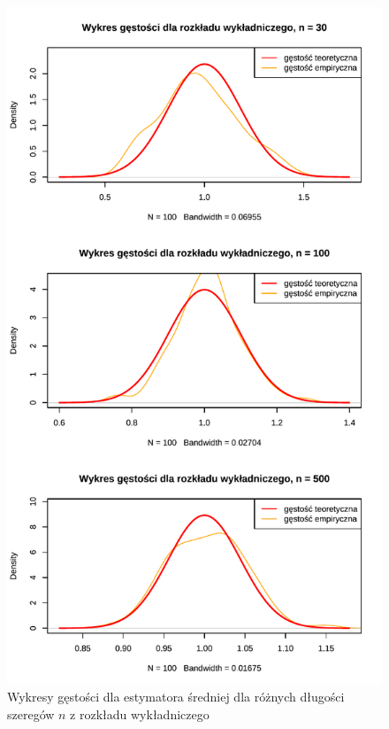\documentclass[10pt, a4paper]{article}\usepackage[]{graphicx}\usepackage[]{xcolor}
\makeatletter
\def\maxwidth{ %
  \ifdim\Gin@nat@width>\linewidth
    \linewidth
  \else
    \Gin@nat@width
  \fi
}
\newenvironment{knitrout}{}{} %
\makeatother
\begin{document}
\begin{knitrout}
\color{fgcolor}\begin{figure}[H]

{\centering \includegraphics[width=\maxwidth]{figure/analiza-sredniej-exp-dens-1} 

}

\caption[Wykresy gęstości dla estymatora średniej dla różnych długości szeregów $n$ z rozkładu wykładniczego]{Wykresy gęstości dla estymatora średniej dla różnych długości szeregów $n$ z rozkładu wykładniczego}\label{fig:analiza-sredniej-exp-dens}
\end{figure}

\end{knitrout}
\end{document}
